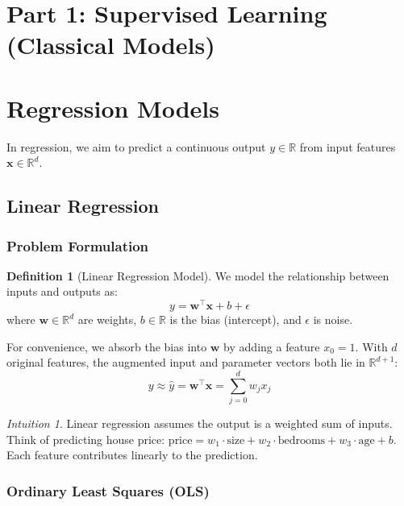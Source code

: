 \documentclass[11pt,twoside]{article}
\numberwithin{equation}{section}
\newcommand{\R}{\mathbb{R}}
\newcommand{\vect}[1]{\bm{#1}}
\theoremstyle{plain}
\theoremstyle{definition}
\newtheorem{definition}[theorem]{Definition}
\theoremstyle{remark}
\newtheorem{intuition}[theorem]{Intuition}
\begin{document}
\section*{Part 1: Supervised Learning (Classical Models)}

\section{Regression Models}
\label{sec:regression-models}

In regression, we aim to predict a continuous output $y \in \R$ from input features $\vect{x} \in \R^d$.

\subsection{Linear Regression}

\subsubsection{Problem Formulation}

\begin{definition}[Linear Regression Model]
We model the relationship between inputs and outputs as:
\[
y = \vect{w}^\top \vect{x} + b + \epsilon
\]
where $\vect{w} \in \R^d$ are weights, $b \in \R$ is the bias (intercept), and $\epsilon$ is noise.

For convenience, we absorb the bias into $\vect{w}$ by adding a feature $x_0 = 1$. With $d$ original features, the augmented input and parameter vectors both lie in $\R^{d+1}$:
\[
y \approx \hat{y} = \vect{w}^\top \vect{x} = \sum_{j=0}^d w_j x_j
\]
\end{definition}

\begin{intuition}
Linear regression assumes the output is a weighted sum of inputs. Think of predicting house price: $\text{price} = w_1 \cdot \text{size} + w_2 \cdot \text{bedrooms} + w_3 \cdot \text{age} + b$. Each feature contributes linearly to the prediction.
\end{intuition}

\subsubsection{Ordinary Least Squares (OLS)}
\end{document}

